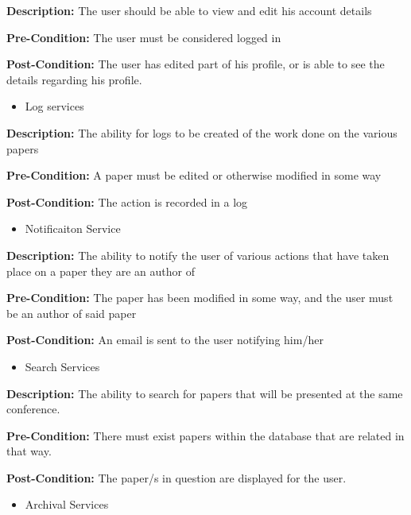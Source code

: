 \documentclass[11pt]{article}
\begin{document}
{\raggedright
	\textbf{Description: }The user should be able to view and edit his account details
}

{\raggedright
	\textbf{Pre-Condition: }The user must be considered logged in
}

{\raggedright
	\textbf{Post-Condition: }The user has edited part of his profile, or is able to see the details regarding his profile.
}

\begin{itemize}
	\item Log services
\end{itemize}

{\raggedright
	\textbf{Description: }The ability for logs to be created of the work done on the various papers
}

{\raggedright
	\textbf{Pre-Condition: }A paper must be edited or otherwise modified in some way
}

{\raggedright
	\textbf{Post-Condition: }The action is recorded in a log
}

\begin{itemize}
	\item Notificaiton Service
\end{itemize}

{\raggedright
	\textbf{Description: }The ability to notify the user of various actions that have taken place on a paper they are an author of
}

{\raggedright
	\textbf{Pre-Condition: }The paper has been modified in some way, and the user must be an author of said paper
}

{\raggedright
	\textbf{Post-Condition: }An email is sent to the user notifying him/her
}

\begin{itemize}
	\item Search Services
\end{itemize}

{\raggedright
	\textbf{Description: }The ability to search for papers that will be presented at the same conference.
}

{\raggedright
	\textbf{Pre-Condition: }There must exist papers within the database that are related in that way.
}

{\raggedright
	\textbf{Post-Condition: }The paper/s in question are displayed for the user.
}

\begin{itemize}
	\item Archival Services
\end{itemize}
\end{document}
